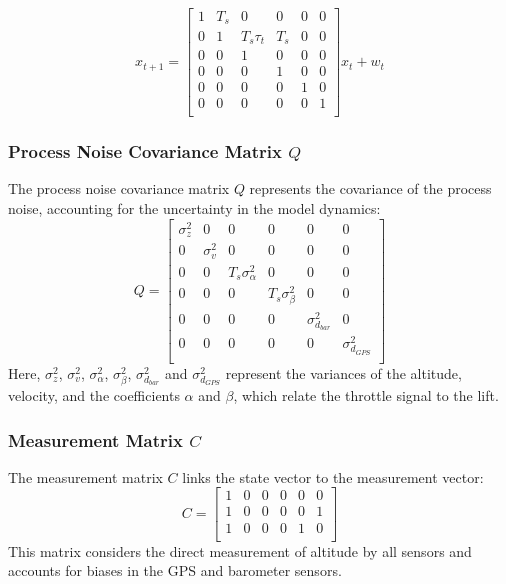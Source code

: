 \documentclass{article}
\begin{document}
    \begin{equation}
      x_{t+1} = 
      \begin{bmatrix}
        1 & T_s & 0 & 0 & 0 & 0\\
        0 & 1 & T_s \tau_t & T_s & 0 & 0\\
        0 & 0 & 1 & 0 & 0 & 0 \\
        0 & 0 & 0 & 1 & 0 & 0 \\
        0 & 0 & 0 & 0 & 1 & 0 \\
        0 & 0 & 0 & 0 & 0 & 1 \\
      \end{bmatrix}
      x_t + w_t
    \end{equation}

    \subsubsection*{Process Noise Covariance Matrix \( Q \)}
    The process noise covariance matrix \( Q \) represents the covariance of the
    process noise, accounting for the uncertainty in the model dynamics:
    \begin{equation}
    Q = 
    \begin{bmatrix}
    \sigma_z^2 & 0 & 0 & 0 & 0 & 0 \\
    0 & \sigma_v^2 & 0 & 0 & 0 & 0 \\
    0 & 0 & T_s \sigma_\alpha^2 & 0 & 0 & 0 \\
    0 & 0 & 0 & T_s \sigma_\beta^2 & 0 & 0 \\
    0 & 0 & 0 & 0 & \sigma^2_{d_{bar}} & 0 \\
    0 & 0 & 0 & 0 & 0 & \sigma^2_{d_{GPS}} \\
    \end{bmatrix}
    \end{equation}
    Here, \( \sigma_z^2 \), \( \sigma_v^2 \), \( \sigma_\alpha^2 \), \(
    \sigma_\beta^2 \), \( \sigma^2_{d_{bar}} \) and \( \sigma^2_{d_{GPS}} \)
    represent the variances of the altitude, velocity, and the coefficients \(
    \alpha \) and \( \beta \), which relate the throttle signal to the lift.

    \subsubsection*{Measurement Matrix \( C \)}
    The measurement matrix \( C \) links the state vector to the measurement
    vector:
    \begin{equation}
    C = 
    \begin{bmatrix}
    1 & 0 & 0 & 0 & 0 & 0 \\
    1 & 0 & 0 & 0 & 0 & 1 \\
    1 & 0 & 0 & 0 & 1 & 0 \\
    \end{bmatrix}
    \end{equation}
    This matrix considers the direct measurement of altitude by all sensors and
    accounts for biases in the GPS and barometer sensors.
\end{document}
